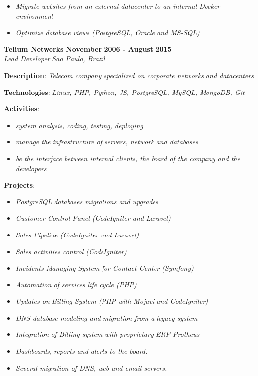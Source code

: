 \documentclass[margin]{res}
\begin{document}
\begin{resume}
\begin{description}
{\begin{itemize}
        \item{\textit{Migrate websites from an external datacenter to an internal Docker environment}}
        \item{\textit{Optimize database views (PostgreSQL, Oracle and MS-SQL)}}
      \end{itemize}
    }
  \end{description}
  \pagebreak
  \textbf{Telium Networks} \hfill \textbf{November 2006 - August 2015}\\
  \textit{Lead Developer} \hfill \textit{Sao Paulo, Brazil}\\
  \begin{description}
    \item{\textbf{Description}: \textit{Telecom company specialized on corporate networks and datacenters}}
    \item{\textbf{Technologies}: \textit{Linux, PHP, Python, JS, PostgreSQL, MySQL, MongoDB, Git}}
    \item{
      \textbf{Activities}:
      \begin{itemize}
        \item{\textit{system analysis, coding, testing, deploying}}
        \item{\textit{manage the infrastructure of servers, network and databases}}
        \item{\textit{be the interface between internal clients, the board of the company and the developers}}
      \end{itemize}
    }
    \item{
      \textbf{Projects}:
      \begin{itemize}
        \item{\textit{PostgreSQL databases migrations and upgrades}}
        \item{\textit{Customer Control Panel (CodeIgniter and Laravel)}}
        \item{\textit{Sales Pipeline (CodeIgniter and Laravel)}}
        \item{\textit{Sales activities control (CodeIgniter)}}
        \item{\textit{Incidents Managing System for Contact Center (Symfony)}}
        \item{\textit{Automation of services life cycle (PHP)}}
        \item{\textit{Updates on Billing System (PHP with Mojavi and CodeIgniter)}}
        \item{\textit{DNS database modeling and migration from a legacy system}}
        \item{\textit{Integration of Billing system with proprietary ERP Protheus}}
        \item{\textit{Dashboards, reports and alerts to the board.}}
        \item{\textit{Several migration of DNS, web and email servers.}}
      \end{itemize}
    }
  \end{description}


\end{resume}
\end{document}

